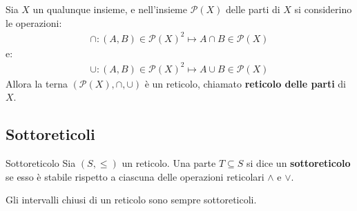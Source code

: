 \begin{example}
	Sia $X$ un qualunque insieme, e nell'insieme $\mathcal{P}(X)$ delle parti di $X$ si considerino le operazioni:
	\begin{align*}
		\cap: (A,B) \in \mathcal{P}(X)^{2} \mapsto A \cap B \in \mathcal{P}(X)
	\end{align*}
	e:
	\begin{align*}
		\cup: (A,B) \in \mathcal{P}(X)^{2} \mapsto A \cup B \in \mathcal{P}(X)
	\end{align*}
	Allora la terna $(\mathcal{P}(X),\cap,\cup)$ è un reticolo, chiamato \textbf{reticolo delle parti} di $X$.
\end{example}


\subsection{Sottoreticoli}
\begin{defbox}{Sottoreticolo}
	Sia $(S,\leq)$ un reticolo. Una parte $T \subseteq S$ si dice un \textbf{sottoreticolo} se esso è stabile rispetto a ciascuna delle operazioni reticolari $\wedge$ e $\vee$.
\end{defbox}

\begin{propbox}
	Gli intervalli chiusi di un reticolo sono sempre sottoreticoli.
\end{propbox}

